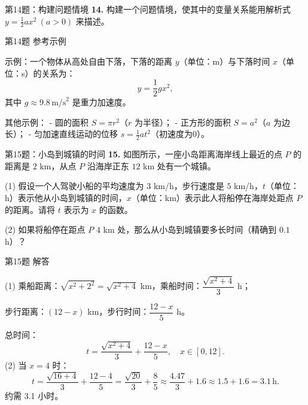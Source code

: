 \documentclass[10pt,aspectratio=169,serif]{beamer}
\begin{document}
\begin{frame}[t]{第14题：构建问题情境}
\textbf{14.} 构建一个问题情境，使其中的变量关系能用解析式 $\displaystyle y=\frac{1}{2}ax^2\ (a>0)$ 来描述。
\end{frame}

\begin{frame}[t]{第14题 参考示例}
\begin{tcolorbox}[colback=orange!10,colframe=orange,title=\textbf{解}]
示例：一个物体从高处自由下落，下落的距离 $y$（单位：m）与下落时间 $x$（单位：s）的关系为：
\[
y=\frac{1}{2}gx^2,
\]
其中 $g\approx 9.8\,\text{m/s}^2$ 是重力加速度。

\vspace{1em}
其他示例：
- 圆的面积 $S=\pi r^2$（$r$ 为半径）；
- 正方形的面积 $S=a^2$（$a$ 为边长）；
- 匀加速直线运动的位移 $s=\frac{1}{2}at^2$（初速度为0）。
\end{tcolorbox}
\end{frame}

\begin{frame}[t]{第15题：小岛到城镇的时间}
\textbf{15.} 如图所示，一座小岛距离海岸线上最近的点 $P$ 的距离是 $2$ km，从点 $P$ 沿海岸正东 $12$ km 处有一个城镇。

\vspace{0.5em}
(1) 假设一个人驾驶小船的平均速度为 $3$ km/h，步行速度是 $5$ km/h，$t$（单位：h）表示他从小岛到城镇的时间，$x$（单位：km）表示此人将船停在海岸处距点 $P$ 的距离。请将 $t$ 表示为 $x$ 的函数。

\vspace{0.5em}
(2) 如果将船停在距点 $P$ $4$ km 处，那么从小岛到城镇要多长时间（精确到 $0.1$ h）？
\end{frame}

\begin{frame}[t]{第15题 解答}
	\vspace{-2em}
\begin{tcolorbox}[colback=orange!10,colframe=orange,title=\textbf{解}]
(1) 乘船距离：$\sqrt{x^2+2^2}=\sqrt{x^2+4}$ km，乘船时间：$\dfrac{\sqrt{x^2+4}}{3}$ h；

\vspace{0.3em}
步行距离：$(12-x)$ km，步行时间：$\dfrac{12-x}{5}$ h。

\vspace{0.5em}
总时间：
\[
t=\frac{\sqrt{x^2+4}}{3}+\frac{12-x}{5},\quad x\in[0,12].
\]
(2) 当 $x=4$ 时：
\[
t=\frac{\sqrt{16+4}}{3}+\frac{12-4}{5}=\frac{\sqrt{20}}{3}+\frac{8}{5}\approx\frac{4.47}{3}+1.6\approx 1.5+1.6=3.1\,\text{h}.
\]
约需 \alert{3.1 小时}。
\end{tcolorbox}
\end{frame}
\end{document}
